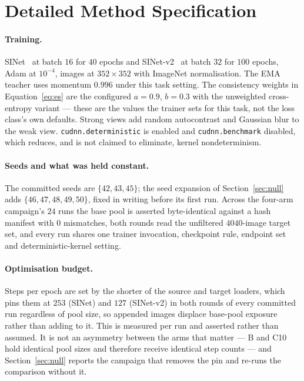 \documentclass{article} %
\begin{document}
\section{Detailed Method Specification}
\label{app:method}

\paragraph{Training.} SINet~\citep{fan2020sinet} at batch $16$ for $40$ epochs and
SINet-v2~\citep{fan2022concealed} at batch $32$ for $100$ epochs, Adam at $10^{-4}$, images at
$352 \times 352$ with ImageNet normalisation. The EMA teacher uses momentum $0.996$ under this task
setting. The consistency weights in Equation~\ref{eq:es} are the configured $a = 0.9$, $b = 0.3$
with the unweighted cross-entropy variant --- these are the values the trainer sets for this task,
not the loss class's own defaults. Strong views add random autocontrast and Gaussian blur to the
weak view. \texttt{cudnn.deterministic} is enabled and \texttt{cudnn.benchmark} disabled, which
reduces, and is not claimed to eliminate, kernel nondeterminism.

\paragraph{Seeds and what was held constant.} The committed seeds are $\{42, 43, 45\}$; the seed
expansion of Section~\ref{sec:null} adds $\{46, 47, 48, 49, 50\}$, fixed in writing before its first
run. Across the four-arm campaign's $24$ runs the base pool is asserted byte-identical against a
hash manifest with $0$ mismatches, both rounds read the unfiltered $4040$-image target set, and
every run shares one trainer invocation, checkpoint rule, endpoint set and deterministic-kernel
setting.

\paragraph{Optimisation budget.} Steps per epoch are set by the shorter of the source and target
loaders, which pins them at $253$ (SINet) and $127$ (SINet-v2) in both rounds of every committed run
regardless of pool size, so appended images displace base-pool exposure rather than adding to it.
This is measured per run and asserted rather than assumed. It is not an asymmetry between the arms
that matter --- B and C10 hold identical pool sizes and therefore receive identical step counts ---
and Section~\ref{sec:null} reports the campaign that removes the pin and re-runs the comparison
without it.
\end{document}
